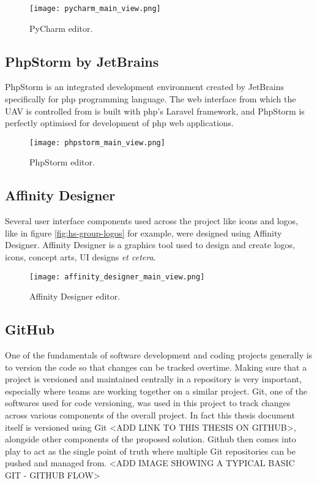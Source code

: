 \begin{figure}[H]
    \centering \texttt{[image: pycharm\_main\_view.png]}
    \caption{PyCharm editor.}
    \label{fig:pycharm}
\end{figure}

\subsection{PhpStorm by JetBrains}
\label{subsec:phpstorm}
PhpStorm is an integrated development environment created by JetBrains specifically for php programming language. The web interface from which the UAV is controlled from is built with php's Laravel framework, and PhpStorm is perfectly optimised for development of php web applications.

\begin{figure}[H]
    \centering \texttt{[image: phpstorm\_main\_view.png]}
    \caption{PhpStorm editor.}
    \label{fig:phpstorm}
\end{figure}

\subsection{Affinity Designer}
\label{subsec:affinity-designer}
Several user interface components used across the project like icons and logos, like in figure \ref{fig:hs-group-logos} for example, were designed using Affinity Designer. Affinity Designer is a graphics tool used to design and create logos, icons, concept arts, UI designs \textit{et cetera}.

\begin{figure}[H]
    \centering \texttt{[image: affinity\_designer\_main\_view.png]}
    \caption{Affinity Designer editor.}
    \label{fig:affinity-designer}
\end{figure}

\subsection{GitHub}
\label{subsec:github}
One of the fundamentals of software development and coding projects generally is to version the code so that changes can be tracked overtime. Making sure that a project is versioned and maintained centrally in a repository is very important, especially where teams are working together on a similar project. Git, one of the softwares used for code versioning, was used in this project to track changes across various components of the overall project. In fact this thesis document itself is versioned using Git <ADD LINK TO THIS THESIS ON GITHUB>, alongside other components of the proposed solution. Github then comes into play to act as the single point of truth where multiple Git repositories can be pushed and managed from.
<ADD IMAGE SHOWING A TYPICAL BASIC GIT - GITHUB FLOW>

